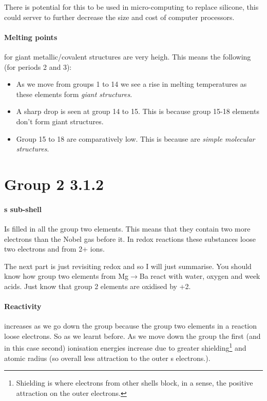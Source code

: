 \documentclass[11pt,a4paper]{memoir}
\begin{document}
	There is potential for this to be used in micro-computing to replace silicone, this could server to further decrease the size and cost of computer processors.
	
	\paragraph{Melting points} for giant metallic/covalent structures are very heigh. This means the following (for periods 2 and 3):
	\begin{itemize}
		\item As we move from groups 1 to 14 we see a rise in melting temperatures as these elements form \textit{giant structures}.
		\item A sharp drop is seen at group 14 to 15. This is because group 15-18 elements don't form giant structures.
		\item Group 15 to 18 are comparatively low. This is because are \textit{simple molecular structures}.
	\end{itemize}
\section{Group 2 3.1.2}

	\paragraph{s sub-shell} Is filled in all the group two elements. This means that they contain two more electrons than the Nobel gas before it. In redox reactions these substances loose two electrons and from 2+ ions.
	
	The next part is just revisiting redox and so I will just summarise. You should know how group two elements from Mg$\rightarrow$Ba react with water, oxygen and week acids. Just know that group 2 elements are oxidised by +2.
	
	\paragraph{Reactivity} increases as we go down the group because the group two elements in a reaction loose electrons. So as we learnt before. As we move down the group the first (and in this case second) ionisation energies increase due to greater shielding\footnote{Shielding is where electrons from other shells block, in a sense, the positive attraction on the outer electrons.} and atomic radius (so overall less attraction to the outer s electrons.).
	
\end{document}
